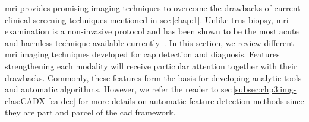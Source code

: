 
\ac{mri} provides promising imaging techniques to overcome the drawbacks of current clinical screening techniques mentioned in \acs{sec}\,\ref{chap:1}.
Unlike \ac{trus} biopsy, \ac{mri} examination is a non-invasive protocol and has been shown to be the most acute and harmless technique available currently~\cite{Turkbey2012}.
In this section, we review different \ac{mri} imaging techniques developed for \ac{cap} detection and diagnosis.
Features strengthening each modality will receive particular attention together with their drawbacks.
Commonly, these features form the basis for developing analytic tools and automatic algorithms.
However, we refer the reader to \acs{sec}\,\ref{subsec:chp3:img-clas:CADX-fea-dec} for more details on automatic feature detection methods since they are part and parcel of the \acs{cad} framework.


